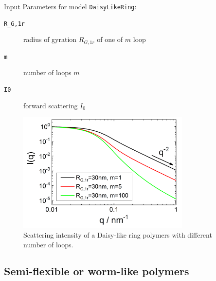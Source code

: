\noindent
\underline{Input Parameters for model \texttt{DaisyLikeRing}:}
\begin{description}
\item[\texttt{R\_G,1r}] radius of gyration $R_{G,1r}$ of one of $m$ loop
\item[\texttt{m}]  number of loops $m$
\item[\texttt{I0}] forward scattering $I_0$
\end{description}

\begin{figure}[htb]
\begin{center}
\includegraphics[width=0.768\textwidth]{../images/form_factor/polymer_rings/DaisyRingIQ.png}
\end{center}
\caption{Scattering intensity of a Daisy-like ring polymers with different number of loops.} \label{fig:DaisyRingIQ}
\end{figure}

\clearpage
\subsection{Semi-flexible or worm-like polymers}
\label{sect:semiflexiblePolymers}
~\\

